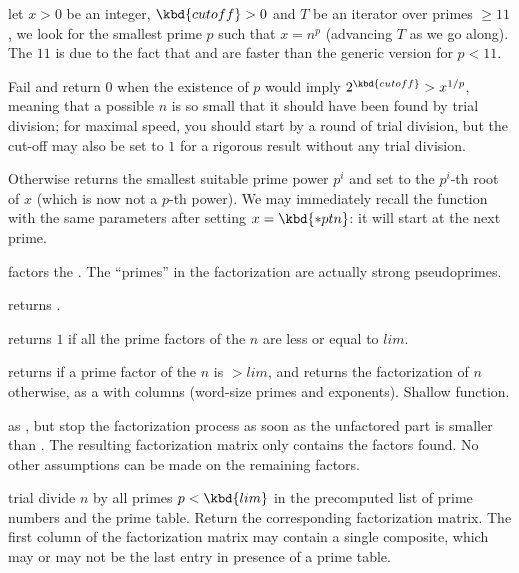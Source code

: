 let $x > 0$ be an integer, $\kbd{cutoff} > 0$ and $T$ be an iterator over
primes $\geq 11$, we look for the smallest prime $p$ such that $x = n^p$
(advancing $T$ as we go along). The $11$ is due to the fact that
 and  are faster than the generic version for
$p < 11$.

Fail and return $0$ when the existence of $p$ would imply $2^{\kbd{cutoff}} >
x^{1/p}$, meaning that a possible $n$ is so small that it should have been
found by trial division; for maximal speed, you should start by a round of
trial division, but the cut-off may also be set to $1$ for a rigorous result
without any trial division.

Otherwise returns the smallest suitable prime power $p^i$ and set 
to the $p^i$-th root of $x$ (which is now not a $p$-th power). We may
immediately recall the function with the same parameters after setting $x =
\kbd{*ptn}$: it will start at the next prime.


 factors the  . The ``primes''
in the factorization are actually strong pseudoprimes.

 returns .

 returns $1$ if all the
prime factors of the  $n$ are less or equal to $lim$.

 returns  if a prime
factor of the  $n$ is $> lim$, and returns the factorization
of $n$ otherwise, as a  with  columns (word-size
primes and exponents). Shallow function.

 as , but stop the
factorization process as soon as the unfactored part is smaller than .
The resulting factorization matrix only contains the factors found. No other
assumptions can be made on the remaining factors.

 trial divide $n$ by all primes $p
< \kbd{lim}$ in the precomputed list of prime numbers and the 
prime table. Return the corresponding factorization matrix. The first column
of the factorization matrix may contain a single composite, which may
or may not be the last entry in presence of a prime table.

